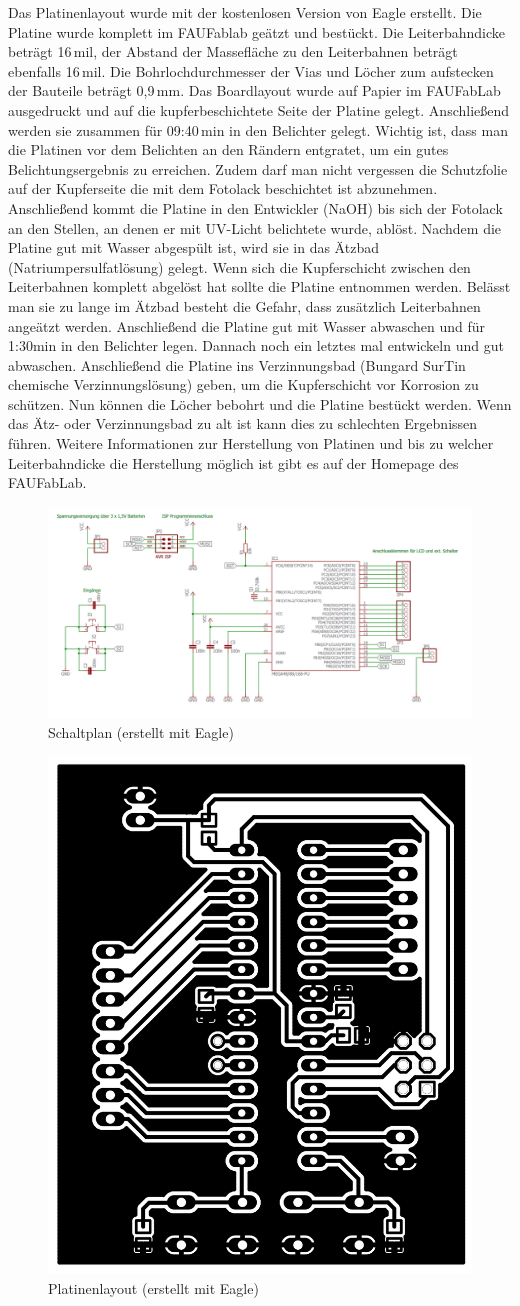 Das Platinenlayout wurde mit der kostenlosen Version von Eagle erstellt. Die Platine wurde komplett im FAUFablab geätzt und bestückt. Die Leiterbahndicke beträgt 16\,mil, der Abstand der Massefläche zu den Leiterbahnen beträgt ebenfalls 16\,mil. Die Bohrlochdurchmesser der Vias und Löcher zum aufstecken der Bauteile beträgt 0,9\,mm. Das Boardlayout wurde auf Papier im FAUFabLab ausgedruckt und auf die kupferbeschichtete Seite der Platine gelegt. Anschließend werden sie zusammen für 09:40\,min in den Belichter gelegt.  Wichtig ist, dass man die Platinen vor dem Belichten an den Rändern entgratet, um ein gutes Belichtungsergebnis zu erreichen. Zudem darf man nicht vergessen die Schutzfolie auf der Kupferseite die mit dem Fotolack beschichtet ist abzunehmen. Anschließend kommt die Platine in den Entwickler (NaOH) bis sich der Fotolack an den Stellen, an denen er mit UV-Licht belichtete wurde, ablöst. Nachdem die Platine gut mit Wasser abgespült ist, wird sie in das Ätzbad (Natriumpersulfatlösung) gelegt. Wenn sich die Kupferschicht zwischen den Leiterbahnen komplett abgelöst hat sollte die Platine entnommen werden. Belässt man sie zu lange im Ätzbad besteht die Gefahr, dass zusätzlich Leiterbahnen angeätzt werden. Anschließend die Platine gut mit Wasser abwaschen und für 1:30min in den Belichter legen. Dannach noch ein letztes mal entwickeln und gut abwaschen. Anschließend die Platine ins Verzinnungsbad (Bungard SurTin chemische Verzinnungslösung) geben, um die Kupferschicht vor Korrosion zu schützen. Nun können die Löcher bebohrt und die Platine bestückt werden.
Wenn das Ätz- oder Verzinnungsbad zu alt ist kann dies zu schlechten Ergebnissen führen.
Weitere Informationen zur Herstellung von Platinen und bis zu welcher Leiterbahndicke die Herstellung möglich ist gibt es auf der Homepage des FAUFabLab.

\begin{figure}[t]
  \centering
  \includegraphics[width=0.5\linewidth, keepaspectratio]{Bilder/DIYShematic}
  \caption{Schaltplan (erstellt mit Eagle)}
  \label{shematic}
\end{figure}

\begin{figure}[t]
  \centering
  \includegraphics[width=0.5\linewidth, keepaspectratio]{Bilder/DIYBoard}
  \caption{Platinenlayout (erstellt mit Eagle)}
  \label{board}
\end{figure}